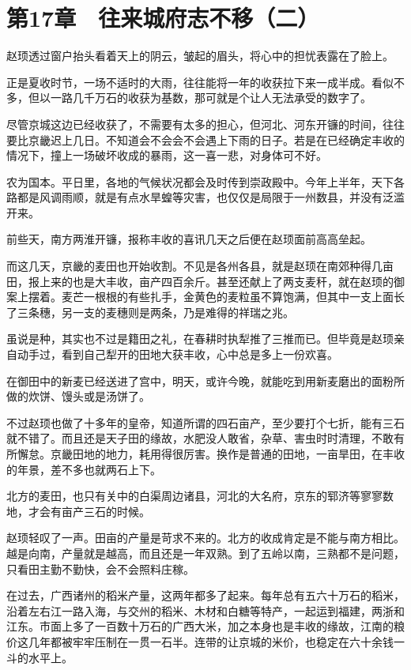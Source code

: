 \section{第17章　往来城府志不移（二）}

赵顼透过窗户抬头看着天上的阴云，皱起的眉头，将心中的担忧表露在了脸上。

正是夏收时节，一场不适时的大雨，往往能将一年的收获拉下来一成半成。看似不多，但以一路几千万石的收获为基数，那可就是个让人无法承受的数字了。

尽管京城这边已经收获了，不需要有太多的担心，但河北、河东开镰的时间，往往要比京畿迟上几日。不知道会不会会不会遇上下雨的日子。若是在已经确定丰收的情况下，撞上一场破坏收成的暴雨，这一喜一悲，对身体可不好。

农为国本。平日里，各地的气候状况都会及时传到崇政殿中。今年上半年，天下各路都是风调雨顺，就是有点水旱蝗等灾害，也仅仅是局限于一州数县，并没有泛滥开来。

前些天，南方两淮开镰，报称丰收的喜讯几天之后便在赵顼面前高高垒起。

而这几天，京畿的麦田也开始收割。不见是各州各县，就是赵顼在南郊种得几亩田，报上来的也是大丰收，亩产四百余斤。甚至还献上了两支麦秆，就在赵顼的御案上摆着。麦芒一根根的有些扎手，金黄色的麦粒虽不算饱满，但其中一支上面长了三条穗，另一支的麦穗则是两条，乃是难得的祥瑞之兆。

虽说是种，其实也不过是籍田之礼，在春耕时执犁推了三推而已。但毕竟是赵顼亲自动手过，看到自己犁开的田地大获丰收，心中总是多上一份欢喜。

在御田中的新麦已经送进了宫中，明天，或许今晚，就能吃到用新麦磨出的面粉所做的炊饼、馒头或是汤饼了。

不过赵顼也做了十多年的皇帝，知道所谓的四石亩产，至少要打个七折，能有三石就不错了。而且还是天子田的缘故，水肥没人敢省，杂草、害虫时时清理，不敢有所懈怠。京畿田地的地力，耗用得很厉害。换作是普通的田地，一亩旱田，在丰收的年景，差不多也就两石上下。

北方的麦田，也只有关中的白渠周边诸县，河北的大名府，京东的郓济等寥寥数地，才会有亩产三石的时候。

赵顼轻叹了一声。田亩的产量是苛求不来的。北方的收成肯定是不能与南方相比。越是向南，产量就是越高，而且还是一年双熟。到了五岭以南，三熟都不是问题，只看田主勤不勤快，会不会照料庄稼。

在过去，广西诸州的稻米产量，这两年都多了起来。每年总有五六十万石的稻米，沿着左右江一路入海，与交州的稻米、木材和白糖等特产，一起运到福建，两浙和江东。市面上多了一百数十万石的广西大米，加之本身也是丰收的缘故，江南的粮价这几年都被牢牢压制在一贯一石半。连带的让京城的米价，也稳定在六十余钱一斗的水平上。


